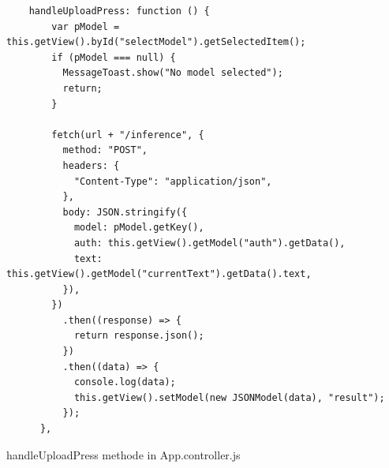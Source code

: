 \begin{listing}[H]
\begin{verbatim}
    handleUploadPress: function () {
        var pModel = this.getView().byId("selectModel").getSelectedItem();
        if (pModel === null) {
          MessageToast.show("No model selected");
          return;
        }

        fetch(url + "/inference", {
          method: "POST",
          headers: {
            "Content-Type": "application/json",
          },
          body: JSON.stringify({
            model: pModel.getKey(),
            auth: this.getView().getModel("auth").getData(),
            text: this.getView().getModel("currentText").getData().text,
          }),
        })
          .then((response) => {
            return response.json();
          })
          .then((data) => {
            console.log(data);
            this.getView().setModel(new JSONModel(data), "result");
          });
      }, 
\end{verbatim}
\caption{handleUploadPress methode in App.controller.js}
\end{listing}
